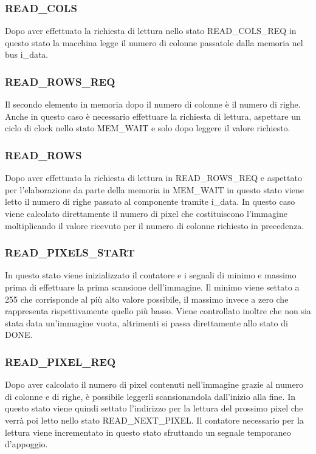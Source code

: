 \documentclass{article}
\begin{document}
\subsubsection{READ\_COLS}
Dopo aver effettuato la richiesta di lettura nello stato READ\_COLS\_REQ in questo stato la macchina legge il numero di colonne passatole dalla memoria nel bus i\_data.

\subsubsection{READ\_ROWS\_REQ}
Il secondo elemento in memoria dopo il numero di colonne è il numero di righe. Anche in questo caso è necessario effettuare la richiesta di lettura, aspettare un ciclo di clock nello stato MEM\_WAIT e solo dopo leggere il valore richiesto.

\subsubsection{READ\_ROWS}
Dopo aver effettuato la richiesta di lettura in READ\_ROWS\_REQ e aspettato per l'elaborazione da parte della memoria in MEM\_WAIT in questo stato viene letto il numero di righe passato al componente tramite i\_data. In questo caso viene calcolato direttamente il numero di pixel che costituiscono l'immagine moltiplicando il valore ricevuto per il numero di colonne richiesto in precedenza.

\subsubsection{READ\_PIXELS\_START}
In questo stato viene inizializzato il contatore  e i segnali di minimo e massimo prima di effettuare la prima scansione dell'immagine. Il minimo viene settato a 255 che corrisponde al più alto valore possibile, il massimo invece a zero che rappresenta rispettivamente quello più basso. Viene controllato inoltre che non sia stata data un'immagine vuota, altrimenti si passa direttamente allo stato di DONE.

\subsubsection{READ\_PIXEL\_REQ}
Dopo aver calcolato il numero di pixel contenuti nell'immagine grazie al numero di colonne e di righe, è possibile leggerli scansionandola dall'inizio alla fine. In questo stato viene quindi settato l'indirizzo per la lettura del prossimo pixel che verrà poi letto nello stato READ\_NEXT\_PIXEL. Il contatore necessario per la lettura viene incrementato in questo stato sfruttando un segnale temporaneo d'appoggio.
\end{document}
